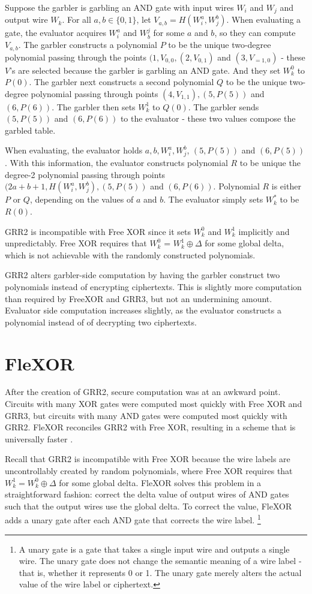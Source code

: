 Suppose the garbler is garbling an AND gate with input wires $W_i$ and $W_j$ and output wire $W_k$.
For all $a,b \in \{0,1\}$, let $V_{a,b} = H(W_i^a, W_j^b)$.
When evaluating a gate, the evaluator acquires $W_i^a$ and $W_b^j$ for some $a$ and $b$, so they can compute $V_{a,b}$.
The garbler constructs a polynomial $P$ to be the unique two-degree polynomial passing through the points $(1, V_{0,0}, (2, V_{0,1})$ and $(3, V_{=1,0})$ - these $V$'s are selected because the garbler is garbling an AND gate.
And they set $W_k^0$ to $P(0)$.
The garbler next constructs a second polynomial $Q$ to be the unique two-degree polynomial passing through points $(4, V_{1,1}), (5, P(5))$ and  $(6, P(6))$.
The garbler then sets $W_k^1$ to $Q(0)$.
The garbler sends $(5, P(5))$ and $(6, P(6))$ to the evaluator - these two values compose the garbled table.

When evaluating, the evaluator holds $a, b, W_i^a, W_j^b$, $(5, P(5))$ and $(6, P(5))$.
With this information, the evaluator constructs polynomial $R$ to be unique the degree-2 polynomial passing through points $(2a + b + 1, H(W_i^a, W_j^b), (5, P(5))$ and $(6, P(6))$.
Polynomial $R$ is either $P$ or $Q$, depending on the values of $a$ and $b$.
The evaluator simply sets $W_k^*$ to be $R(0)$.

GRR2 is incompatible with Free XOR since it sets $W_k^0$ and $W_k^1$ implicitly and unpredictably.
Free XOR requires that $W_k^0$ = $W_k^1 \oplus \Delta$ for some global delta, which is not achievable with the randomly constructed polynomials.

GRR2 alters garbler-side computation by having the garbler construct two polynomials instead of encrypting ciphertexts.
This is slightly more computation than required by FreeXOR and GRR3, but not an undermining amount.
Evaluator side computation increases slightly, as the evaluator constructs a polynomial instead of of decrypting two ciphertexts.


\section{FleXOR}
After the creation of GRR2, secure computation was at an awkward point.
Circuits with many XOR gates were computed most quickly with Free XOR and GRR3, but circuits with many AND gates were computed most quickly with GRR2.
FleXOR reconciles GRR2 with Free XOR, resulting in a scheme that is universally faster \cite{flexor}.

Recall that GRR2 is incompatible with Free XOR because the wire labels are uncontrollably created by random polynomials, where Free XOR requires that $W_k^1 = W_k^0 \oplus \Delta$ for some global delta.
FleXOR solves this problem in a straightforward fashion: correct the delta value of output wires of AND gates such that the output wires use the global delta.
To correct the value, FleXOR adds a unary gate after each AND gate that corrects the wire label. \footnote{A unary gate is a gate that takes a single input wire and outputs a single wire. The unary gate does not change the semantic meaning of a wire label - that is, whether it represents 0 or 1. The unary gate merely alters the actual value of the wire label or ciphertext.}

